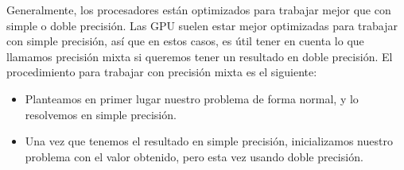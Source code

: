 Generalmente, los procesadores están optimizados para trabajar mejor que con simple o doble precisión. Las GPU suelen estar mejor optimizadas para trabajar con simple precisión, así que en estos casos, es útil tener en cuenta lo que llamamos precisión mixta si queremos tener un resultado en doble precisión. El procedimiento para trabajar con precisión mixta es el siguiente:

\begin{itemize}
\item Planteamos en primer lugar nuestro problema de forma normal, y lo resolvemos en simple precisión.
\item Una vez que tenemos el resultado en simple precisión, inicializamos nuestro problema con el valor obtenido, pero esta vez usando doble precisión.
\end{itemize}

